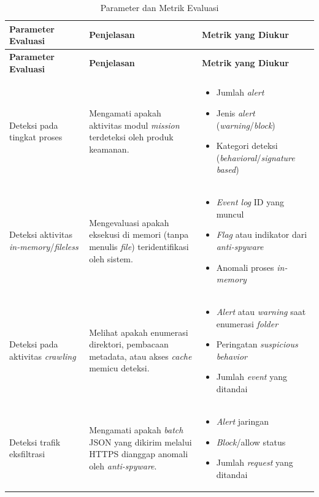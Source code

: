 \begin{longtable}{|p{3.2cm}|p{4.5cm}|p{4.6cm}|}
\caption{Parameter dan Metrik Evaluasi}
\label{tbl:param-metrik} \\
\hline
\textbf{Parameter Evaluasi} & \textbf{Penjelasan} & \textbf{Metrik yang Diukur} \\
\hline
\endfirsthead

\hline
\textbf{Parameter Evaluasi} & \textbf{Penjelasan} & \textbf{Metrik yang Diukur} \\
\hline
\endhead

\hline
\endfoot

Deteksi pada tingkat proses 
& 
Mengamati apakah aktivitas modul \textit{mission} terdeteksi oleh produk keamanan.
&
\begin{itemize}[leftmargin=*]
  \item Jumlah \textit{alert}
  \item Jenis \textit{alert} (\textit{warning}/\textit{block})
  \item Kategori deteksi (\textit{behavioral}/\textit{signature based})
\end{itemize}
\\
\hline

Deteksi aktivitas \textit{in-memory}/\textit{fileless}
&
Mengevaluasi apakah eksekusi di memori (tanpa menulis \textit{file}) teridentifikasi oleh sistem.
&
\begin{itemize}[leftmargin=*]
  \item \textit{Event log} ID yang muncul
  \item \textit{Flag} atau indikator dari \textit{anti-spyware}
  \item Anomali proses \textit{in-memory}
\end{itemize}
\\
\hline

Deteksi pada aktivitas \textit{crawling}
&
Melihat apakah enumerasi direktori, pembacaan metadata, atau akses \textit{cache} memicu deteksi.
&
\begin{itemize}[leftmargin=*]
  \item \textit{Alert} atau \textit{warning} saat enumerasi \textit{folder}
  \item Peringatan \textit{suspicious behavior}
  \item Jumlah \textit{event} yang ditandai
\end{itemize}
\\
\hline

Deteksi trafik eksfiltrasi
&
Mengamati apakah \textit{batch} JSON yang dikirim melalui HTTPS dianggap anomali oleh \textit{anti-spyware}.
&
\begin{itemize}[leftmargin=*]
  \item \textit{Alert} jaringan
  \item \textit{Block}/allow status
  \item Jumlah \textit{request} yang ditandai
\end{itemize}
\\
\hline


\end{longtable}
